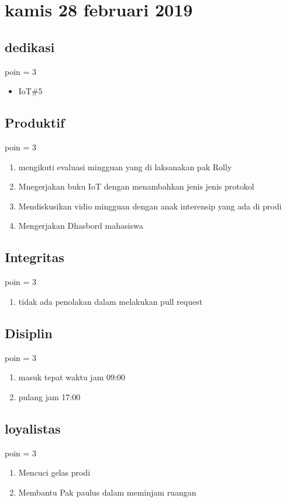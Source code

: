 \section{kamis 28 februari 2019}
\subsection{dedikasi}
poin = 3
\begin{itemize}
  \item IoT\#5
\end{itemize}
\subsection{Produktif}
poin = 3
\begin{enumerate}
  \item mengikuti evaluasi mingguan yang di laksanakan pak Rolly
  \item Mnegerjakan buku IoT dengan menambahkan jenis jenis protokol
  \item Mendiskusikan vidio mingguan dengan anak interensip yang ada di prodi
  \item Mengerjakan Dhasbord mahasiswa 
\end{enumerate}
\subsection{Integritas}
poin = 3
\begin{enumerate}
  \item tidak ada penolakan dalam melakukan pull request
\end{enumerate}
\subsection{Disiplin}
poin = 3
\begin{enumerate}
  \item masuk tepat waktu jam 09:00
  \item pulang jam 17:00
\end{enumerate}
\subsection{loyalistas}
poin = 3
\begin{enumerate}
  \item Mencuci gelas prodi 
  \item Membantu Pak paulus dalam meminjam ruangan
\end{enumerate}